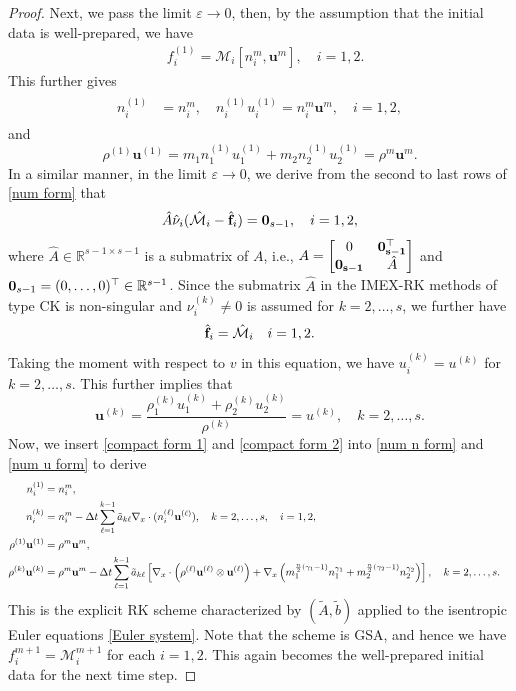 \documentclass[10pt,reqno]{amsart}
\numberwithin{equation}{section}
\begin{document}
\begin{proof}
Next, we pass the limit $\varepsilon\to 0$, then, by the assumption that the initial data is well-prepared, we have 
\begin{align}\label{compact form 1}
	&f_i^{(1)}=\mathcal{M}_i[n_i^m,\mathbf{u}^m],\quad i=1,2.
\end{align}
This further gives
\begin{align*}%
	\begin{split}
		n_i^{(1)} &=n_i^m,\quad n_i^{(1)}u_i^{(1)}=n_i^m \mathbf{u}^m,\quad i=1,2,
	\end{split}
\end{align*}
and
\[
\rho^{(1)}\mathbf{u}^{(1)}=m_1n_1^{(1)}u_1^{(1)}+m_2n_2^{(1)}u_2^{(1)}=\rho^m \mathbf{u}^m.
\]
In a similar manner, in the limit $\varepsilon\to 0$, we derive from the second to last rows of \eqref{num form} that
\begin{align*}
	\hat{A}\hat{\bf{\nu}}_i(\hat{\bf{\mathcal{M}}}_i-\hat{\bf{f}}_i)={\bf{0}}_{s-1},\quad i=1,2,
\end{align*}
where $\hat{A}\in \mathbb{R}^{s-1 \times s-1}$ is a submatrix of $A$, i.e., $A=\begin{bmatrix}
	0 &\bf{0}_{s-1}^\top\\
\bf{0}_{s-1}&\hat{A}
\end{bmatrix}$ and ${\bf{0}}_{s-1}=(0,\dots,0)^\top \in \mathbb{R}^{s-1}$.
Since the submatrix $\hat{A}$ in the IMEX-RK methods of type CK is non-singular and $\nu_i^{(k)}\neq 0$ is assumed for $k=2,\dots,s$, we further have
\begin{align}\label{compact form 2}
	{\hat{\bf{f}}_i=\hat{\bf{\mathcal{M}}}_i} \quad i=1,2.
\end{align}
Taking the moment with respect to $v$ in this equation, we have $u_i^{(k)}=u^{(k)}$ for $k=2,\dots,s$. This further implies that 
$$\textbf{u}^{(k)}=\frac{\rho_1^{(k)} u_1^{(k)} + \rho_2^{(k)} u_2^{(k)}}{\rho^{(k)}}=u^{(k)},\quad k=2,\dots,s.$$
Now, we insert \eqref{compact form 1} and \eqref{compact form 2} into \eqref{num n form} and \eqref{num u form} to derive
\begin{align*}%
	\begin{split}
		n_i^{(1)} &=n_i^m,\cr
		n_i^{(k)} &= n_i^{m} - \Delta t\sum_{\ell=1}^{k-1}\tilde{a}_{k\ell}  \nabla_x \cdot (n_i^{(\ell)} \mathbf{u}^{(\ell)}),\quad k=2,\dots,s, \quad i=1,2,\cr
			\rho^{(1)}\mathbf{u}^{(1)} &=\rho^m \mathbf{u}^m,\cr
		\rho^{(k)} \mathbf{u}^{(k)} &= \rho^{m} \mathbf{u}^{m} - \Delta t\sum_{\ell=1}^{k-1}\tilde{a}_{k\ell}  \left[\nabla_x \cdot \left(\rho^{(\ell)} \mathbf{u}^{(\ell)} \otimes \mathbf{u}^{(\ell)} \right)+ \nabla_x\left( m_1^{\frac{n}{2}(\gamma_1 - 1)} n_1^{\gamma_1}+ m_2^{\frac{n}{2}(\gamma_2 - 1)} n_2^{\gamma_2}\right)\right],\quad k=2,\dots,s.
	\end{split}
\end{align*}
This is the explicit RK scheme characterized by $(\tilde{A}, \tilde{b})$ applied to the isentropic Euler equations \eqref{Euler system}. Note that the scheme is GSA, and hence we have $f_i^{m+1}=\mathcal{M}_i^{m+1}$ for each $i=1,2$. This again becomes the well-prepared initial data for the next time step.
\end{proof}
\end{document}
